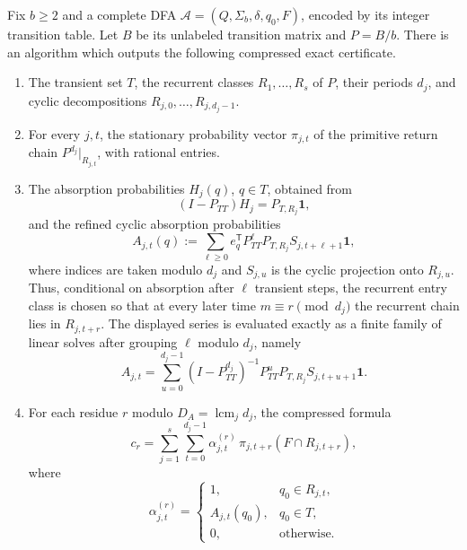 \begin{theorem}
  \label{thm:effective-fixed-dfa-prime-obstruction}
  Fix \(b\ge2\) and a complete DFA
  \(\mathcal A=(Q,\Sigma_b,\delta,q_0,F)\), encoded by its integer
  transition table. Let \(B\) be its unlabeled transition matrix and
  \(P=B/b\). There is an algorithm which outputs the following
  compressed exact certificate.
  \begin{enumerate}[label=\textup{(\alph*)}]
    \item The transient set \(T\), the recurrent classes
    \(R_1,\dots,R_s\) of \(P\), their periods \(d_j\), and cyclic
    decompositions \(R_{j,0},\dots,R_{j,d_j-1}\).
    \item For every \(j,t\), the stationary probability vector
    \(\pi_{j,t}\) of the primitive return chain
    \(P^{d_j}|_{R_{j,t}}\), with rational entries.
    \item The absorption probabilities \(H_j(q)\), \(q\in T\), obtained
    from
    \[
      (I-P_{TT})H_j=P_{T,R_j}\mathbf 1,
    \]
    and the refined cyclic absorption probabilities
    \[
      A_{j,t}(q)
      :=\sum_{\ell\ge0}
        e_q^{\mathsf T}P_{TT}^{\ell}P_{T,R_j}
        S_{j,t+\ell+1}\mathbf 1 ,
    \]
    where indices are taken modulo \(d_j\) and
    \(S_{j,u}\) is the cyclic projection onto \(R_{j,u}\).
    Thus, conditional on absorption after \(\ell\) transient steps, the
    recurrent entry class is chosen so that at every later time
    \(m\equiv r\pmod {d_j}\) the recurrent chain lies in
    \(R_{j,t+r}\). The displayed series is evaluated exactly as a
    finite family of linear solves after grouping \(\ell\) modulo
    \(d_j\), namely
    \[
      A_{j,t}
      =
      \sum_{u=0}^{d_j-1}
      (I-P_{TT}^{d_j})^{-1}P_{TT}^uP_{T,R_j}
      S_{j,t+u+1}\mathbf 1 .
    \]
    \item For each residue \(r\) modulo
    \(D_A=\operatorname{lcm}_j d_j\), the compressed formula
    \begin{equation}
      c_r=
      \sum_{j=1}^s\sum_{t=0}^{d_j-1}
      \alpha_{j,t}^{(r)}\,
      \pi_{j,t+r}(F\cap R_{j,t+r}),
      \label{eq:compressed-cr}
    \end{equation}
    where
    \[
      \alpha_{j,t}^{(r)}=
      \begin{cases}
        1, & q_0\in R_{j,t},\\
        A_{j,t}(q_0), & q_0\in T,\\
        0, & \text{otherwise.}
      \end{cases}
\]
\end{enumerate}
\end{theorem}
